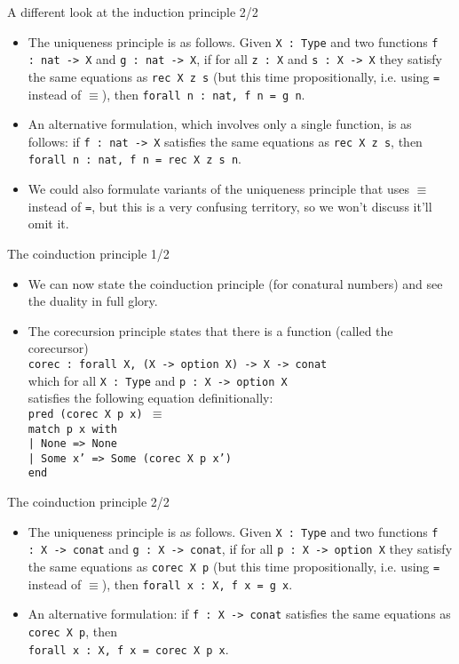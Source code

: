 \documentclass{beamer}
\begin{document}
\begin{frame}{A different look at the induction principle 2/2}
\begin{itemize}
	\item The uniqueness principle is as follows. Given \texttt{X :\ Type} and two functions \texttt{f :\ nat -> X} and \texttt{g :\ nat -> X}, if for all \texttt{z :\ X} and \texttt{s :\ X -> X} they satisfy the same equations as \texttt{rec X z s} (but this time propositionally, i.e. using \texttt{=} instead of $\equiv$), then \texttt{forall n :\ nat, f n = g n}.
  \item An alternative formulation, which involves only a single function, is as follows: if \texttt{f :\ nat -> X} satisfies the same equations as \texttt{rec X z s}, then \\
  \texttt{forall n :\ nat, f n = rec X z s n}.
  \item We could also formulate variants of the uniqueness principle that uses $\equiv$ instead of \texttt{=}, but this is a very confusing territory, so we won't discuss it'll omit it.
\end{itemize}
\end{frame}

\begin{frame}{The coinduction principle 1/2}
\begin{itemize}
	\item We can now state the coinduction principle (for conatural numbers) and see the duality in full glory.
	\item The corecursion principle states that there is a function (called the corecursor) \\
	\texttt{corec :\ forall X, (X -> option X) -> X -> conat} \\
  which for all \texttt{X :\ Type} and \texttt{p :\ X -> option X} \\
  satisfies the following equation definitionally: \\
	\texttt{pred (corec X p x) $\equiv$ \\
	match p x with \\
	| None => None \\
	| Some x' => Some (corec X p x') \\
	end}
\end{itemize}
\end{frame}

\begin{frame}{The coinduction principle 2/2}
\begin{itemize}
	\item The uniqueness principle is as follows. Given \texttt{X :\ Type} and two functions \texttt{f :\ X -> conat} and \texttt{g :\ X -> conat}, if for all \texttt{p :\ X -> option X} they satisfy the same equations as \texttt{corec X p} (but this time propositionally, i.e. using \texttt{=} instead of $\equiv$), then \texttt{forall x :\ X, f x = g x}.
  \item An alternative formulation: if \texttt{f :\ X -> conat} satisfies the same equations as \texttt{corec X p}, then \\
  \texttt{forall x :\ X, f x = corec X p x}.
\end{itemize}
\end{frame}
\end{document}
